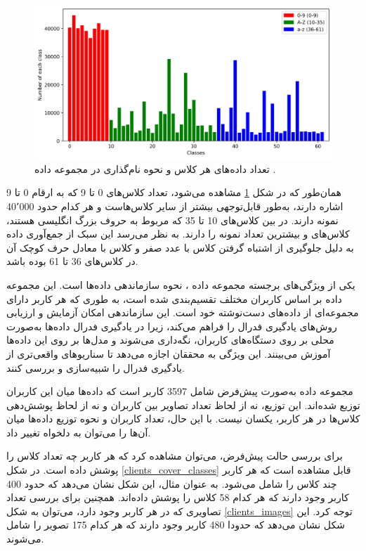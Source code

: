 \begin{figure}[t!]
	\centering
	\includegraphics[scale=0.7]{images/chap5/count_all_classes.png}%
	\caption{%
تعداد داده‌های هر کلاس و نحوه نام‌گذاری در مجموعه داده
		.
	}
	\label{count_all_classes}
	\centering
\end{figure}

همان‌طور که در شکل
\ref{count_all_classes}
مشاهده می‌شود، تعداد کلاس‌های 0 تا 9 که به ارقام 0 تا 9 اشاره دارند، به‌طور قابل‌توجهی بیشتر از سایر کلاس‌هاست و هر کدام حدود 40٬000 نمونه دارند. در بین کلاس‌های 10 تا 35 که مربوط به حروف بزرگ انگلیسی هستند، کلاس‌های  و  بیشترین تعداد نمونه را دارند. به نظر می‌رسد این سبک از جمع‌آوری داده به دلیل جلوگیری از اشتباه گرفتن کلاس  با عدد صفر و کلاس  با معادل حرف کوچک آن در کلاس‌های 36 تا 61 بوده باشد.


یکی از ویژگی‌های برجسته مجموعه داده
،
نحوه سازماندهی داده‌ها است. این مجموعه داده بر اساس کاربران مختلف تقسیم‌بندی شده است، به طوری که هر کاربر دارای مجموعه‌ای از داده‌های دست‌نوشته خود است. این سازماندهی امکان آزمایش و ارزیابی روش‌های یادگیری فدرال را فراهم می‌کند، زیرا در یادگیری فدرال داده‌ها به‌صورت محلی بر روی دستگاه‌های کاربران، نگه‌داری می‌شوند و مدل‌ها بر روی این داده‌ها آموزش می‌بینند. این ویژگی به محققان اجازه می‌دهد تا سناریوهای واقعی‌تری از یادگیری فدرال را شبیه‌سازی و بررسی کنند.

مجموعه داده
به‌صورت پیش‌فرض شامل 3597 کاربر است که داده‌ها میان این کاربران توزیع شده‌اند. این توزیع، نه از لحاظ تعداد تصاویر بین کاربران و نه از لحاظ پوشش‌دهی کلاس‌ها در هر کاربر، یکسان نیست. با این حال، تعداد کاربران و نحوه توزیع داده‌ها میان آن‌ها را می‌توان به دلخواه تغییر داد.

برای بررسی حالت پیش‌فرض، می‌توان مشاهده کرد که هر کاربر چه تعداد کلاس را پوشش داده است. در شکل
\ref{clients_cover_classes}
قابل مشاهده است که هر کاربر چند کلاس را شامل می‌شود. به عنوان مثال، این شکل نشان می‌دهد که حدود 400 کاربر وجود دارند که هر کدام 58 کلاس را پوشش داده‌اند. همچنین برای بررسی تعداد تصاویری که در هر کاربر وجود دارد، می‌توان به شکل
\ref{clients_images}
توجه کرد. این شکل نشان می‌دهد که حدودا 480 کاربر وجود دارند که هر کدام 175 تصویر را شامل می‌شوند.



